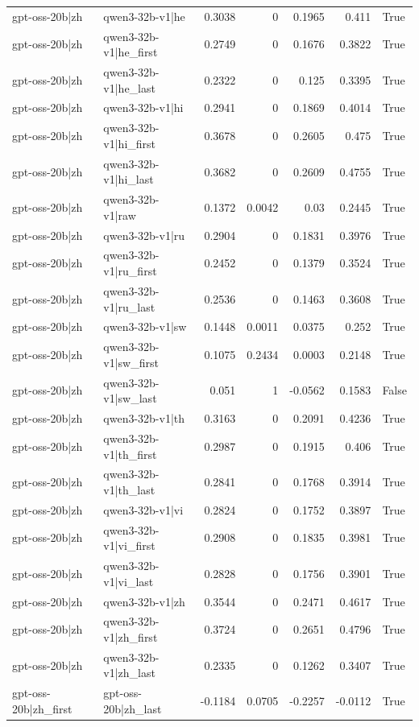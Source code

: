 \begin{table}
\begin{tabular}{l l r r r r l}
gpt-oss-20b|zh & qwen3-32b-v1|he & 0.3038 & 0 & 0.1965 & 0.411 & True \\
gpt-oss-20b|zh & qwen3-32b-v1|he_first & 0.2749 & 0 & 0.1676 & 0.3822 & True \\
gpt-oss-20b|zh & qwen3-32b-v1|he_last & 0.2322 & 0 & 0.125 & 0.3395 & True \\
gpt-oss-20b|zh & qwen3-32b-v1|hi & 0.2941 & 0 & 0.1869 & 0.4014 & True \\
gpt-oss-20b|zh & qwen3-32b-v1|hi_first & 0.3678 & 0 & 0.2605 & 0.475 & True \\
gpt-oss-20b|zh & qwen3-32b-v1|hi_last & 0.3682 & 0 & 0.2609 & 0.4755 & True \\
gpt-oss-20b|zh & qwen3-32b-v1|raw & 0.1372 & 0.0042 & 0.03 & 0.2445 & True \\
gpt-oss-20b|zh & qwen3-32b-v1|ru & 0.2904 & 0 & 0.1831 & 0.3976 & True \\
gpt-oss-20b|zh & qwen3-32b-v1|ru_first & 0.2452 & 0 & 0.1379 & 0.3524 & True \\
gpt-oss-20b|zh & qwen3-32b-v1|ru_last & 0.2536 & 0 & 0.1463 & 0.3608 & True \\
gpt-oss-20b|zh & qwen3-32b-v1|sw & 0.1448 & 0.0011 & 0.0375 & 0.252 & True \\
gpt-oss-20b|zh & qwen3-32b-v1|sw_first & 0.1075 & 0.2434 & 0.0003 & 0.2148 & True \\
gpt-oss-20b|zh & qwen3-32b-v1|sw_last & 0.051 & 1 & -0.0562 & 0.1583 & False \\
gpt-oss-20b|zh & qwen3-32b-v1|th & 0.3163 & 0 & 0.2091 & 0.4236 & True \\
gpt-oss-20b|zh & qwen3-32b-v1|th_first & 0.2987 & 0 & 0.1915 & 0.406 & True \\
gpt-oss-20b|zh & qwen3-32b-v1|th_last & 0.2841 & 0 & 0.1768 & 0.3914 & True \\
gpt-oss-20b|zh & qwen3-32b-v1|vi & 0.2824 & 0 & 0.1752 & 0.3897 & True \\
gpt-oss-20b|zh & qwen3-32b-v1|vi_first & 0.2908 & 0 & 0.1835 & 0.3981 & True \\
gpt-oss-20b|zh & qwen3-32b-v1|vi_last & 0.2828 & 0 & 0.1756 & 0.3901 & True \\
gpt-oss-20b|zh & qwen3-32b-v1|zh & 0.3544 & 0 & 0.2471 & 0.4617 & True \\
gpt-oss-20b|zh & qwen3-32b-v1|zh_first & 0.3724 & 0 & 0.2651 & 0.4796 & True \\
gpt-oss-20b|zh & qwen3-32b-v1|zh_last & 0.2335 & 0 & 0.1262 & 0.3407 & True \\
gpt-oss-20b|zh_first & gpt-oss-20b|zh_last & -0.1184 & 0.0705 & -0.2257 & -0.0112 & True \\

\end{tabular}
\end{table}
